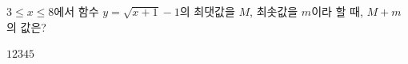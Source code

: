 \hspace*{2mm}\begin{minipage}[t]{\dimexpr\linewidth-2mm\relax}\vspace{0pt}
$3\le x\le 8$에서 함수 $y=\sqrt{x+1}-1$의 최댓값을 $M$, 최솟값을 $m$이라 할 때, $M+m$의 값은?
\begin{choices32}{$1$}{$2$}{$3$}{$4$}{$5$}\end{choices32}\end{minipage}
